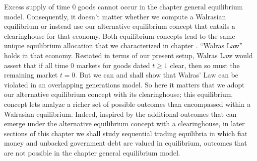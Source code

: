 Excess supply of time $0$
goods cannot occur in the chapter 
general equilibrium model. Consequently, it doesn't  matter
whether we compute a Walrasian equilibrium or instead use our
alternative equilibrium concept that entails a
clearinghouse for that economy. Both equilibrium 
concepts lead to the same unique equilibrium allocation 
that we characterized in chapter .
``Walras Law'' holds in that economy. Restated in
terms of our present setup, Walras Law would
assert  that if all time $0$ markets for goods dated 
$t\geq 1$ clear, then  so must the remaining market $t=0$.
But we can and shall  show that  Walras' Law can be 
violated in an overlapping generations model.
So here it matters that we adopt our  alternative
equilibrium concept with its clearinghouse; this equilibrium concept lets 
 analyze a richer set of possible 
outcomes than encompassed within  a Walrasian equilibrium. 
Indeed, inspired by the additional 
outcomes that can  emerge under the alternative 
equilibrium concept with a clearinghouse, in later sections of this chapter we shall 
study sequential trading equilibria 
in which fiat money and unbacked government debt 
are   valued in equilibrium, outcomes that are not possible in the chapter  general 
equilibrium model.







